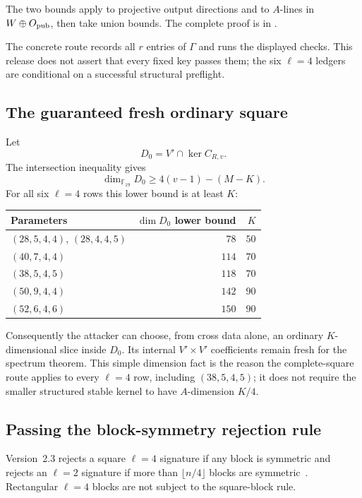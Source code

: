 \documentclass[11pt]{article}
\newcommand{\F}{\mathbb F}
\begin{document}
The two bounds apply  to projective output
directions and to $A$-lines in $W\oplus O_{\rm pub}$, then take union bounds.
The complete proof is in .

The concrete route records all $r$ entries of $\Gamma$ and runs the displayed
checks.  This release does not assert that every fixed key passes them; the six
$\ell=4$ ledgers are conditional on a successful structural preflight.

\subsection{The guaranteed fresh ordinary square}
Let
\[
  D_0=V'\cap\ker C_{R,v}.
\]
The intersection inequality gives
\begin{equation}
  \dim_{\F_{19}}D_0
  \ge 4(v-1)-(M-K).                                  \label{eq:fresh-slice-dim}
\end{equation}
For all six $\ell=4$ rows this lower bound is at least $K$:
\begin{center}
\small
\begin{tabular}{@{}l r r@{}}
\toprule
Parameters & $\dim D_0$ lower bound & $K$\\
\midrule
$(28,5,4,4)$, $(28,4,4,5)$ & $78$ & $50$\\
$(40,7,4,4)$ & $114$ & $70$\\
$(38,5,4,5)$ & $118$ & $70$\\
$(50,9,4,4)$ & $142$ & $90$\\
$(52,6,4,6)$ & $150$ & $90$\\
\bottomrule
\end{tabular}
\end{center}
Consequently the attacker can choose, from cross data alone, an ordinary
$K$-dimensional slice inside $D_0$.  Its internal $V'\times V'$ coefficients
remain fresh for the spectrum theorem.  This simple dimension fact is the
reason the complete-square route applies to every $\ell=4$ row, including
$(38,5,4,5)$; it does not require the smaller structured stable kernel to have
$A$-dimension $K/4$.

\subsection{Passing the block-symmetry rejection rule}
Version~2.3 rejects a square $\ell=4$ signature if any block is symmetric and
rejects an $\ell=2$ signature if more than $\lfloor n/4\rfloor$ blocks are
symmetric~\cite{SNOVA23}.  Rectangular $\ell=4$ blocks are not subject to the
square-block rule.
\end{document}
